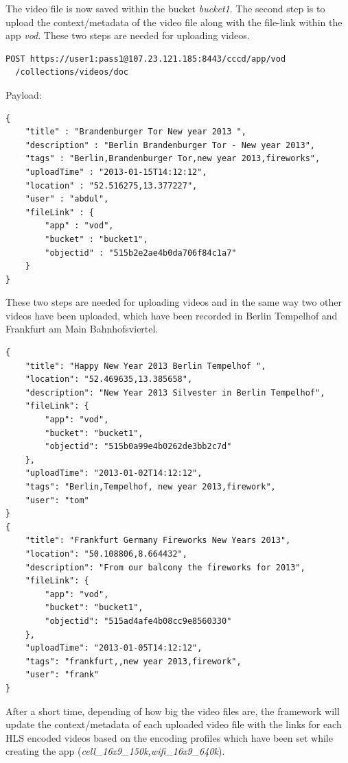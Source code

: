 The video file is now saved within the bucket \textit{bucket1}. The second step is to upload the context/metadata of the video file along with the file-link within the app \textit{vod}. These two steps are needed for uploading videos. 
\begin{code}
\begin{verbatim}
POST https://user1:pass1@107.23.121.185:8443/cccd/app/vod
  /collections/videos/doc
\end{verbatim}
Payload:
\begin{verbatim}
{
	"title" : "Brandenburger Tor New year 2013 ",
	"description" : "Berlin Brandenburger Tor - New year 2013",
	"tags" : "Berlin,Brandenburger Tor,new year 2013,fireworks",
	"uploadTime" : "2013-01-15T14:12:12",
	"location" : "52.516275,13.377227",
	"user" : "abdul",
	"fileLink" : {
		"app" : "vod",
		"bucket" : "bucket1", 
		"objectid" : "515b2e2ae4b0da706f84c1a7"
	}
}
\end{verbatim}
\end{code}

These two steps are needed for uploading videos and in the same way two other videos have been uploaded, which have been recorded in Berlin Tempelhof and Frankfurt am Main Bahnhofsviertel. 
\begin{code}
\begin{verbatim}
{
	"title": "Happy New Year 2013 Berlin Tempelhof ",
	"location": "52.469635,13.385658",
	"description": "New Year 2013 Silvester in Berlin Tempelhof",
	"fileLink": {
		"app": "vod",
		"bucket": "bucket1",
		"objectid": "515b0a99e4b0262de3bb2c7d"
	},
	"uploadTime": "2013-01-02T14:12:12",
	"tags": "Berlin,Tempelhof, new year 2013,firework",
	"user": "tom"
}
{
	"title": "Frankfurt Germany Fireworks New Years 2013",
	"location": "50.108806,8.664432",
	"description": "From our balcony the fireworks for 2013",
	"fileLink": {
		"app": "vod",
		"bucket": "bucket1",
		"objectid": "515ad4afe4b08cc9e8560330"
	},
	"uploadTime": "2013-01-05T14:12:12",
	"tags": "frankfurt,,new year 2013,firework",
	"user": "frank"
}
\end{verbatim}
\end{code}

After a short time, depending of how big the video files are, the framework will update the context/metadata of each uploaded video file with the links for each \ac{HLS} encoded videos based on the encoding profiles which have been set while creating the app (\textit{cell\_16x9\_150k,wifi\_16x9\_640k}).


